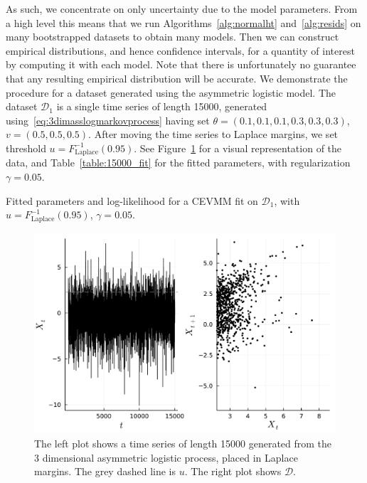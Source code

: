 \documentclass[11pt,twoside,openany]{book}
\newcommand{\D}{\mathcal{D}}
\numberwithin{Theorem}{chapter}
\numberwithin{Definition}{chapter}
\numberwithin{Lemma}{chapter}
\numberwithin{Algorithm}{chapter}
\numberwithin{equation}{chapter}
\begin{document}
As such, we concentrate on only uncertainty due to the model parameters. From a
high level this means that we run Algorithms~\ref{alg:normalht}
and~\ref{alg:resids} on many bootstrapped datasets to obtain many models. Then
we can construct empirical distributions, and hence confidence intervals, for a
quantity of interest by computing it with each model. Note that there is unfortunately no
guarantee that any resulting empirical distribution will be accurate.
We demonstrate the procedure for
a dataset generated using the asymmetric logistic model.
The dataset $\D_1$ is a single time series of length 15000, generated
using~\eqref{eq:3dimasslogmarkovprocess} having set
$\theta = (0.1,0.1,0.1,0.3,0.3,0.3)$, $v = (0.5,0.5,0.5)$. After moving the time series to Laplace
margins, we set threshold $u = F_{\text{Laplace}}^{-1}(0.95)$. See
Figure~\ref{fig:block_bootstrap_Xs} for a visual representation of the data, and
Table~\ref{table:15000_fit} for the fitted parameters, with regularization $\gamma = 0.05$.

\begin{table}[htp]
  \centering
    
\caption{Fitted parameters and log-likelihood for a CEVMM fit on $\D_1$, with $u=F_{\text{Laplace}}^{-1}(0.95)$, $\gamma = 0.05$.\label{table:15000_fit}}
\end{table}

\begin{figure}[htp]
  \centering
  \includegraphics[scale=0.75]{../ht-em/figures/block_bootstrap_Xs.pdf}
  \caption{The left plot shows a time series of length 15000 generated from
  the 3 dimensional asymmetric logistic process, placed in Laplace margins. The
grey dashed line is $u$. The right plot shows $\D$.}\label{fig:block_bootstrap_Xs}
\end{figure}
\end{document}

